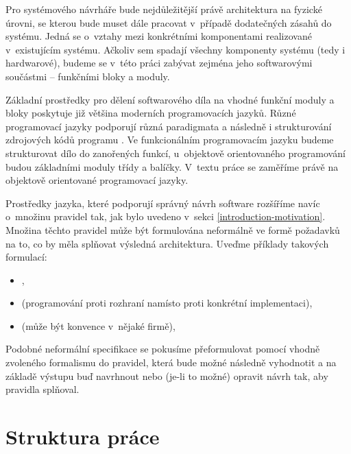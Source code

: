 Pro systémového návrháře bude nejdůležitější právě architektura na fyzické úrovni, se kterou bude muset dále pracovat v~případě dodatečných zásahů do systému. Jedná se o~vztahy mezi konkrétními komponentami realizované v~existujícím systému. Ačkoliv sem spadají všechny komponenty systému (tedy i hardwarové), budeme se v~této práci zabývat zejména jeho softwarovými součástmi -- funkčními bloky a moduly.

Základní prostředky pro dělení softwarového díla na vhodné funkční moduly a bloky poskytuje již většina moderních programovacích jazyků. Různé programovací jazyky podporují různá paradigmata a následně i strukturování zdrojových kódů programu \cite{wiki:programming_paradigm}. Ve funkcionálním programovacím jazyku budeme strukturovat dílo do zanořených funkcí, u~objektově orientovaného programování budou základními moduly třídy a balíčky. V~textu práce se zaměříme právě na objektově orientované programovací jazyky.

Prostředky jazyka, které podporují správný návrh software rozšíříme navíc o~množinu pravidel tak, jak bylo uvedeno v~sekci \ref{introduction-motivation}. Množina těchto pravidel může být formulována neformálně ve formě požadavků na to, co by měla splňovat výsledná architektura. Uveďme příklady takových formulací:

\begin{itemize}
\item {},
\item {} (programování proti rozhraní namísto proti konkrétní implementaci),
\item {} (může být konvence v~nějaké firmě),
\end{itemize}

Podobné neformální specifikace se pokusíme přeformulovat pomocí vhodně zvoleného formalismu do pravidel, která bude možné následně vyhodnotit a na základě výstupu buď navrhnout nebo (je-li to možné) opravit návrh tak, aby pravidla splňoval.

\section{Struktura práce}

